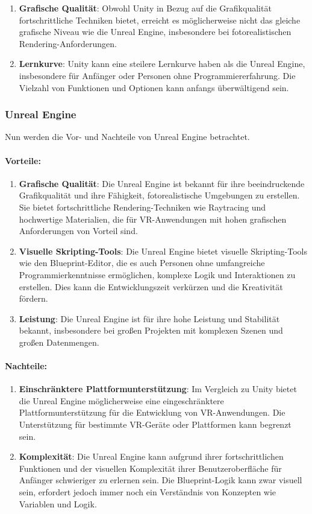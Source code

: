 \begin{enumerate}
\item \textbf{Grafische Qualität}: Obwohl Unity in Bezug auf die Grafikqualität fortschrittliche Techniken bietet, erreicht es möglicherweise nicht das gleiche grafische Niveau wie die Unreal Engine, insbesondere bei fotorealistischen Rendering-Anforderungen.
\item \textbf{Lernkurve}: Unity kann eine steilere Lernkurve haben als die Unreal Engine, insbesondere für Anfänger oder Personen ohne Programmiererfahrung. Die Vielzahl von Funktionen und Optionen kann anfangs überwältigend sein.
\end{enumerate}

\subsubsection{Unreal Engine}
Nun werden die Vor- und Nachteile von Unreal Engine betrachtet.
\paragraph{Vorteile:}

\begin{enumerate}
\item \textbf{Grafische Qualität}: Die Unreal Engine ist bekannt für ihre beeindruckende Grafikqualität und ihre Fähigkeit, fotorealistische Umgebungen zu erstellen. Sie bietet fortschrittliche Rendering-Techniken wie Raytracing und hochwertige Materialien, die für VR-Anwendungen mit hohen grafischen Anforderungen von Vorteil sind.
\item \textbf{Visuelle Skripting-Tools}: Die Unreal Engine bietet visuelle Skripting-Tools wie den Blueprint-Editor, die es auch Personen ohne umfangreiche Programmierkenntnisse ermöglichen, komplexe Logik und Interaktionen zu erstellen. Dies kann die Entwicklungszeit verkürzen und die Kreativität fördern.

\item \textbf{Leistung}: Die Unreal Engine ist für ihre hohe Leistung und Stabilität bekannt, insbesondere bei großen Projekten mit komplexen Szenen und großen Datenmengen.
\end{enumerate}

\paragraph{Nachteile:}

\begin{enumerate}
\item \textbf{Einschränktere Plattformunterstützung}: Im Vergleich zu Unity bietet die Unreal Engine möglicherweise eine eingeschränktere Plattformunterstützung für die Entwicklung von VR-Anwendungen. Die Unterstützung für bestimmte VR-Geräte oder Plattformen kann begrenzt sein.
\item \textbf{Komplexität}: Die Unreal Engine kann aufgrund ihrer fortschrittlichen Funktionen und der visuellen Komplexität ihrer Benutzeroberfläche für Anfänger schwieriger zu erlernen sein. Die Blueprint-Logik kann zwar visuell sein, erfordert jedoch immer noch ein Verständnis von Konzepten wie Variablen und Logik.
\end{enumerate}

